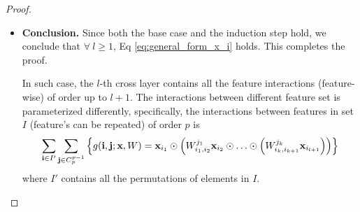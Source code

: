 \documentclass[sigconf]{acmart}
\newcommand{\vecx}{{\bf x}}
\newcommand{\veci}{{\bf i}}
\newcommand{\vecj}{{\bf j}}
\begin{document}
\begin{proof}
\begin{itemize}[leftmargin=0em]
\item[] {\bf Conclusion.} Since both the base case and the induction step hold, we conclude that $\forall~ l \ge 1$, Eq \eqref{eq:general_form_x_i} holds. This completes the proof.

In such case, the $l$-th cross layer contains all the feature interactions (feature-wise) of order up to $l+1$. The interactions between different feature set is parameterized differently, specifically, the interactions between features in set $I$ (feature's can be repeated) of order $p$ is 
\begin{equation*}
\begin{split}
\sum_{{\bf i} \in I'} \sum_{\vecj \in C_p^{p-1}} \left\{g(\veci, \vecj; \vecx, W)
= \vecx_{i_1} \odot \left(W_{i_1, i_2}^{j_1} \vecx_{i_2} \odot \ldots \odot \left(W_{i_k, i_{k+1}}^{j_{k}} \vecx_{i_{l+1}}\right) \right)\right\}
\end{split}
\end{equation*}
where $I'$ contains all the permutations of elements in $I$.

\end{itemize}
\end{proof}
\end{document}
